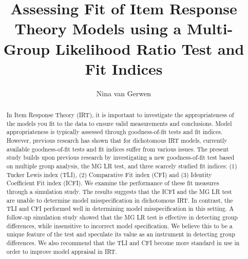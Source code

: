 \documentclass[Royal,sageapa,times,doublespace]{sagej}
\begin{document}

\title{Assessing Fit of Item Response Theory Models using a Multi-Group Likelihood Ratio Test and Fit Indices}

\author{Nina van Gerwen } %




\begin{abstract}
{\small
In Item Response Theory (IRT), it is important to investigate the appropriateness of the models you fit to the data to ensure valid measurements and conclusions. Model appropriateness is typically assessed through goodness-of-fit tests and fit indices. However, previous research has shown that for dichotomous IRT models, currently available goodness-of-fit tests and fit indices suffer from various issues. The present study builds upon previous research by investigating a new goodness-of-fit test based on multiple group analysis, the MG LR test, and three scarcely studied fit indices: (1) Tucker Lewis index (TLI), (2) Comparative Fit index (CFI) and (3) Identity Coefficient Fit index (ICFI). We examine the performance of these fit measures through a simulation study. The results suggests that the ICFI and the MG LR test are unable to determine model misspecification in dichotomous IRT. In contrast, the TLI and CFI performed well in determining model misspecification in this setting. A follow-up simulation study showed that the MG LR test is effective in detecting group differences, while insensitive to incorrect model specification. We believe this to be a unique feature of the test and speculate its value as an instrument in detecting group differences. We also recommend that the TLI and CFI become more standard in use in order to improve model appraisal in IRT. 
\par}
\end{abstract}


\maketitle
\end{document}
